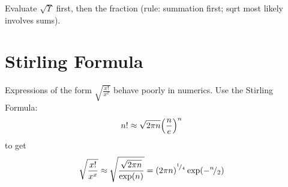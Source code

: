 \documentclass[
	english,
	a4paper,
	fontsize=10pt,
	parskip=half,
	titlepage=true,
	DIV=12,
	final
]{scrreprt}
\newcommand*{\smallfrac}  [2]{\ensuremath{{}^        {#1} \!/_        {#2}}}
\begin{document}
Evaluate $\sqrt{\Upsilon}$ first, then the fraction (rule: summation first; sqrt most likely involves sums).

\chapter{Stirling Formula}
Expressions of the form $\sqrt{\frac{x!}{x^x}}$ behave poorly in numerics. Use the Stirling Formula:
\begin{align*}
	n! 
&\approx
	\sqrt{2\pi n}
	\qty(\frac{n}{e})^n
\end{align*}
to get
\begin{align*}
	\sqrt{\frac{x!}{x^x}}
&\approx
	\sqrt{
		\frac
			{\sqrt{2\pi n}}
			{\exp(n)}
	}
=
	\qty(2\pi n)^{\smallfrac{1}{4}}
	\exp(-\smallfrac{n}{2})
\end{align*}
\end{document}
